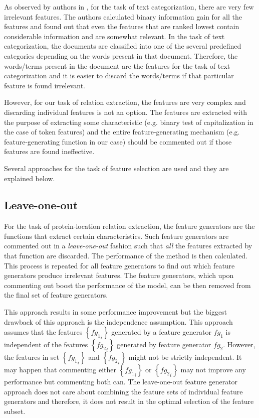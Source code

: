 As observed by authors in \cite{joachims1998text}, for the task of text categorization, there are very few irrelevant features. The authors calculated binary information gain for all the features and found out that even the features that are ranked lowest contain considerable information and are somewhat relevant. In the task of text categorization, the documents are classified into one of the several predefined categories depending on the words present in that document. Therefore, the words/terms present in the document are the features for the task of text categorization and it is easier to discard the words/terms if that particular feature is found irrelevant.

However, for our task of relation extraction, the features are very complex and discarding individual features is not an option. The features are extracted with the purpose of extracting some characteristic (e.g. binary test of capitalization in the case of token features) and the entire feature-generating mechanism (e.g. feature-generating function in our case) should be commented out if those features are found ineffective.

Several approaches for the task of feature selection are used and they are explained below.

\subsection{Leave-one-out}\label{subsec:LeaveOneOut}

For the task of protein-location relation extraction, the feature generators are the functions that extract certain characteristics. Such feature generators are commented out in a \emph{leave-one-out} fashion such that \emph{all} the features extracted by that function are discarded. The performance of the method is then calculated. This process is repeated for all feature generators to find out which feature generators produce irrelevant features. The feature generators, which upon commenting out boost the performance of the model, can be then removed from the final set of feature generators.

This approach results in some performance improvement but the biggest drawback of this approach is the independence assumption. This approach assumes that the features $\left\lbrace {fg_1}_i \right\rbrace$ generated by a feature generator $fg_1$ is independent of the features $\left\lbrace {fg_2}_i \right\rbrace$ generated by feature generator $fg_2$. However, the features in set $\left\lbrace {fg_1}_i \right\rbrace$ and $\left\lbrace {fg_2}_i \right\rbrace$ might not be strictly independent. It may happen that commenting either $\left\lbrace {fg_1}_i \right\rbrace$ or $\left\lbrace {fg_2}_i \right\rbrace$ may not improve any performance but commenting both can. The leave-one-out feature generator approach does not care about combining the feature sets of individual feature generators and therefore, it does not result in the optimal selection of the feature subset.

